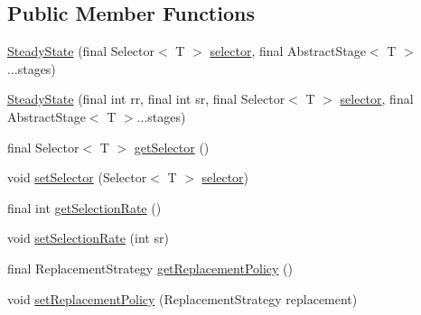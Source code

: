 \subsection*{Public Member Functions}
\begin{DoxyCompactItemize}
\item 
\hyperlink{classjenes_1_1stage_1_1operator_1_1common_1_1_steady_state_3_01_t_01extends_01_chromosome_01_4_af39cd5e467ed1a020779c89894c5f63e}{Steady\-State} (final Selector$<$ T $>$ \hyperlink{classjenes_1_1stage_1_1operator_1_1common_1_1_steady_state_3_01_t_01extends_01_chromosome_01_4_a83a734a69acdc4ee13d42982a43e8ba1}{selector}, final Abstract\-Stage$<$ T $>$...stages)
\item 
\hyperlink{classjenes_1_1stage_1_1operator_1_1common_1_1_steady_state_3_01_t_01extends_01_chromosome_01_4_a3411aeb67d5f0914fdb6682627a507c9}{Steady\-State} (final int rr, final int sr, final Selector$<$ T $>$ \hyperlink{classjenes_1_1stage_1_1operator_1_1common_1_1_steady_state_3_01_t_01extends_01_chromosome_01_4_a83a734a69acdc4ee13d42982a43e8ba1}{selector}, final Abstract\-Stage$<$ T $>$...stages)
\item 
final Selector$<$ T $>$ \hyperlink{classjenes_1_1stage_1_1operator_1_1common_1_1_steady_state_3_01_t_01extends_01_chromosome_01_4_ac9493ab808eed1e19961d6ba1b97b52d}{get\-Selector} ()
\item 
void \hyperlink{classjenes_1_1stage_1_1operator_1_1common_1_1_steady_state_3_01_t_01extends_01_chromosome_01_4_ad4c63d6921648fac68ea074d8fb49002}{set\-Selector} (Selector$<$ T $>$ \hyperlink{classjenes_1_1stage_1_1operator_1_1common_1_1_steady_state_3_01_t_01extends_01_chromosome_01_4_a83a734a69acdc4ee13d42982a43e8ba1}{selector})
\item 
final int \hyperlink{classjenes_1_1stage_1_1operator_1_1common_1_1_steady_state_3_01_t_01extends_01_chromosome_01_4_a667fecf88fd68c6a89de0ee327eb9dcf}{get\-Selection\-Rate} ()
\item 
void \hyperlink{classjenes_1_1stage_1_1operator_1_1common_1_1_steady_state_3_01_t_01extends_01_chromosome_01_4_ad3182abb1581d4136efe349b46c4dba9}{set\-Selection\-Rate} (int sr)
\item 
final Replacement\-Strategy \hyperlink{classjenes_1_1stage_1_1operator_1_1common_1_1_steady_state_3_01_t_01extends_01_chromosome_01_4_ae8a1e24e3306c72bdf30094774b68915}{get\-Replacement\-Policy} ()
\item 
void \hyperlink{classjenes_1_1stage_1_1operator_1_1common_1_1_steady_state_3_01_t_01extends_01_chromosome_01_4_ab142c49cb09d7325f9bcc5d029acd36b}{set\-Replacement\-Policy} (Replacement\-Strategy replacement)

\end{DoxyCompactItemize}
